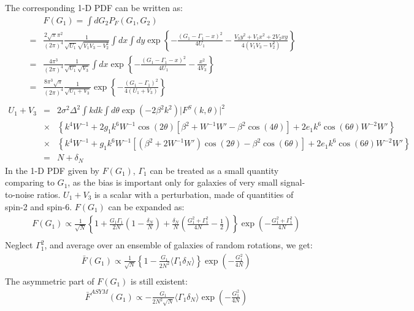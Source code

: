 \documentclass[onecolumn]{aastex62}
\begin{document}
The corresponding 1-D PDF can be written as:
\begin{eqnarray}
&&F(G_1)=\int dG_2P_F(G_1,G_2)\\ \nonumber
&=&\frac{2\sqrt{\pi}\pi^2}{(2\pi)^4}\frac{1}{\sqrt{U_1}\sqrt{V_1V_3-V_2^2}}\int dx\int dy\exp\left\{-\frac{(G_1-\Gamma_1-x)^2}{4U_1}-\frac{V_3y^2+V_1x^2+2V_2xy}{4(V_1V_3-V_2^2)}\right\} \\ \nonumber
&=&\frac{4\pi^3}{(2\pi)^4}\frac{1}{\sqrt{U_1}\sqrt{V_3}}\int dx\exp\left\{-\frac{(G_1-\Gamma_1-x)^2}{4U_1}-\frac{x^2}{4V_3}\right\} \\ \nonumber
&=&\frac{8\pi^3\sqrt{\pi}}{(2\pi)^4}\frac{1}{\sqrt{U_1+V_3}}\exp\left\{-\frac{(G_1-\Gamma_1)^2}{4(U_1+V_3)}\right\} \\ \nonumber
\end{eqnarray}
\begin{eqnarray}
U_1+V_3&=&2\sigma^2\Delta^2\int kdk\int d\theta\exp(-2\beta^2k^2)\vert F^S(k,\theta)\vert^2\\ \nonumber
&\times&\left\{k^4W^{-1}+2g_1k^6W^{-1}\cos(2\theta)[\beta^2+W^{-1}W'-\beta^2\cos(4\theta)]+2e_1k^6\cos(6\theta)W^{-2}W'\right\}\\ \nonumber
&\times&\left\{k^4W^{-1}+g_1k^6W^{-1}[(\beta^2+2W^{-1}W')\cos(2\theta)-\beta^2\cos(6\theta)]+2e_1k^6\cos(6\theta)W^{-2}W'\right\}\\ \nonumber
&=&N+\delta_N
\end{eqnarray}
In the 1-D PDF given by $F(G_1)$, $\Gamma_1$ can be treated as a small quantity comparing to $G_1$, as the bias is important only for galaxies of very small signal-to-noise ratios. $U_1+V_3$ is a scalar with a perturbation, made of quantities of spin-2 and spin-6. $F(G_1)$ can be expanded as:
\begin{eqnarray}
&&F(G_1)\propto\frac{1}{\sqrt{N}}\left\{1+\frac{G_1\Gamma_1}{2N}\left(1-\frac{\delta_N}{N}\right)+\frac{\delta_N}{N}\left(\frac{G_1^2+\Gamma_1^2}{4N}-\frac{1}{2}\right)\right\}\exp\left(-\frac{G_1^2+\Gamma_1^2}{4N}\right) \\ \nonumber
\end{eqnarray} 
Neglect $\Gamma_1^2$, and average over an ensemble of galaxies of random rotations, we get:
\begin{eqnarray}
&&\bar{F}(G_1)\propto\frac{1}{\sqrt{N}}\left\{1-\frac{G_1}{2N^2}\langle\Gamma_1\delta_N\rangle\right\}\exp\left(-\frac{G_1^2}{4N}\right) \\ \nonumber
\end{eqnarray} 
The asymmetric part of $F(G_1)$ is still existent:
\begin{eqnarray}
\label{asym_f}
&&\bar{F}^{ASYM}(G_1)\propto-\frac{G_1}{2N^2\sqrt{N}}\langle\Gamma_1\delta_N\rangle\exp\left(-\frac{G_1^2}{4N}\right) \\ \nonumber
\end{eqnarray} 
\end{document}
